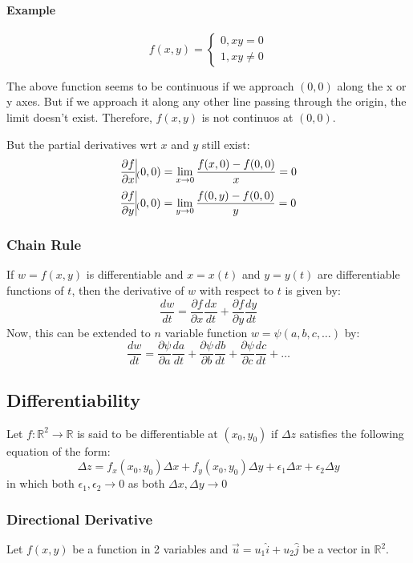 \documentclass{article}
\begin{document}
\paragraph*{Example}
\[ f(x,y) = \begin{cases}
    0, xy = 0\\
    1, xy \neq 0
    
\end{cases} \]

The above function seems to be continuous if we approach $(0,0)$ along the x or y axes.
But if we approach it along any other line passing through the origin, the limit doesn't exist.
Therefore, $f(x,y)$ is not continuos at $(0,0)$.

But the partial derivatives wrt $x$ and $y$ still exist:
\[ \frac{\partial f}{\partial x} \vline_(0,0) = \lim_{x \rightarrow 0} \frac{f(x,0) - f(0,0)}{x} = 0\]
\[ \frac{\partial f}{\partial y} \vline_(0,0) = \lim_{y \rightarrow 0} \frac{f(0,y) - f(0,0)}{y} = 0\]

\subsubsection{Chain Rule}

If $w = f(x,y)$ is differentiable and $x = x(t)$ and $y=y(t)$ are differentiable functions of $t$, then the derivative of $w$ with respect to $t$ is given by:
\[ \frac{dw}{dt} = \frac{\partial f}{\partial x}\frac{dx}{dt} + \frac{\partial f}{\partial y}\frac{dy}{dt} \]
Now, this can be extended to $n$ variable function $w = \psi(a,b,c,\dots)$ by:
\[ \frac{dw}{dt} = \frac{\partial \psi}{\partial a}\frac{da}{dt} + \frac{\partial \psi}{\partial b}\frac{db}{dt} +\frac{\partial \psi}{\partial c}\frac{dc}{dt} + \dots \]

\subsection{Differentiability}
Let $f: \mathbb{R}^2 \rightarrow \mathbb{R}$ is said to be differentiable at $(x_0,y_0)$ if $\Delta z$ satisfies the following equation of the form:
\[ \Delta z = f_x(x_0,y_0)\Delta x + f_y(x_0,y_0)\Delta y + \epsilon_1 \Delta x + \epsilon_2 \Delta y\]
in which both $\epsilon_1, \epsilon_2 \rightarrow 0$ as both $\Delta x, \Delta y \rightarrow 0$


\subsubsection{Directional Derivative}
Let $f(x,y)$ be a function in 2 variables and $\vec{u} = u_1 \hat{i} + u_2 \hat{j}$ be a vector in $\mathbb{R}^2$.
\end{document}
